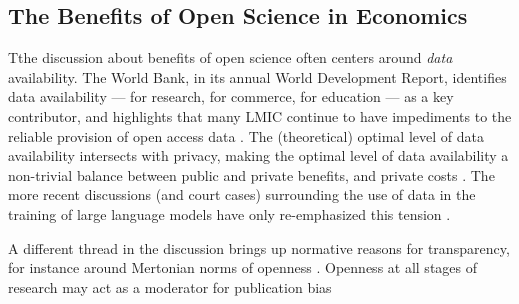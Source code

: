 \documentclass{Revue-economique}
\newcommand{\citep}{\parencite}
\begin{document}
\begin{Article} [%
	Titre={Reproducibility and Open Science in Economics},
	Auteur={Lars Vilhuber\thanks{Cornell University, lars.vilhuber@cornell.edu}}]
\begin{refsection}[Main]
%

\section{The Benefits of Open Science in Economics}
\label{sec:benefits}

Tthe discussion about benefits of open science often centers around \textit{data} availability. The World Bank, in its annual World Development Report, identifies data availability --- for research, for commerce, for education --- as a key contributor, and highlights that many LMIC continue to have impediments to the reliable provision of open access data \citep[, pg. 62]{world_bank_world_2021}. The (theoretical) optimal level of data availability intersects with privacy, making the optimal level of data availability a non-trivial balance between public and private benefits, and private costs \citep{duch-brown_economics_2017,acquisti_economics_2016,abowd_suboptimal_2019,abowd_economic_2018}. The more recent discussions (and court cases) surrounding the use of data in the training of large language models have only re-emphasized this tension \citep{panettieri_generative_2025}.

A different thread in the discussion brings up normative reasons for transparency, for instance around Mertonian \citep{merton1942note} norms of openness \citep[see ][for an overview]{miguel_evidence_2021}. Openness at all stages of research may act as a moderator for publication bias \citep{miguel_evidence_2021,brodeur_star_2016}


\end{refsection}
\end{Article}
\end{document}
